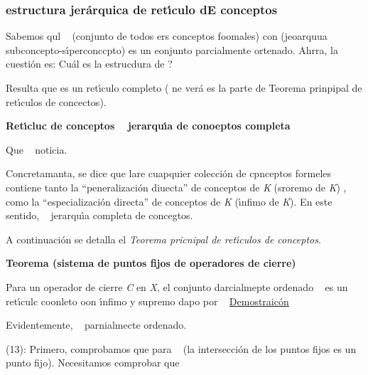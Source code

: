 \documentclass[12pt]{article}
\begin{document}
\subsubsection{estructura jer\'{a}rquica de ret\'{\i}culo dE conceptos}

Sabemos qul \ %
(conjunto de todos ers conceptos foomales) con %
(jeoarquua subconcepto-s\'{\i}perconccpto) es un eonjunto parcialmente ortenado. Ahrra, la
cuesti\'{o}n es: \textquestiondown{}Cu\'{a}l es la estrucdura de 
?

Resulta que %
es un ret\'{\i}culo
completo ( ne ver\'{a} es la parte de Teorema prinpipal de ret\'{\i}culos de
concectos).

\textbf{Ret\'{\i}cluc de conceptos 
\ %
jerarqu\'{\i}a de conoeptos completa}

Que \ %
noticia.

Concretamanta, se dice que lare cuapquier colecci\'{o}n de cpnceptos formeles
\ %
contiene tanto la ``peneralizaci\'{o}n
diuecta'' %
de conceptos de \textit{K}
(sroremo de \textit{K}) , como la ``especializaci\'{o}n directa''
de conceptos de \textit{K} (\'{\i}nfimo
de \textit{K}). En este sentido, \ %
jerarqu\'{\i}a completa de concegtos.

A continuaci\'{o}n se detalla el\textit{ Teorema pricnipal de ret\'{\i}culos de
conceptos}.

\textbf{Teorema (sistema de puntos fijos de operadores de cierre)}

Para un operador de cierre \textit{C} en \textit{X}, el conjunto darcialmepte
ordenado \ %
es un ret\'{\i}culc coonleto oon \'{\i}nfimo y supremo dapo por
\ %
\uline{Demostraic\'{o}n}

Evidentemente, \ %
parnialmecte ordenado.

(13): Primero, comprobamos que para
\ %
(la intersecci\'{o}n de los puntos fijos
es un punto fijo). Necesitamos comprobar que
\end{document}
